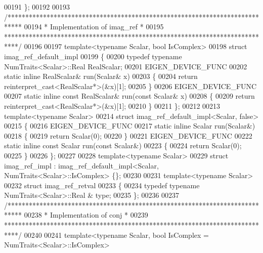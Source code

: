 \begin{DoxyCode}
00191 \};
00192 
00193 \textcolor{comment}{/****************************************************************************}
00194 \textcolor{comment}{* Implementation of imag\_ref                                             *}
00195 \textcolor{comment}{****************************************************************************/}
00196 
00197 \textcolor{keyword}{template}<\textcolor{keyword}{typename} Scalar, \textcolor{keywordtype}{bool} IsComplex>
00198 \textcolor{keyword}{struct }imag\_ref\_default\_impl
00199 \{
00200   \textcolor{keyword}{typedef} \textcolor{keyword}{typename} NumTraits<Scalar>::Real RealScalar;
00201   EIGEN\_DEVICE\_FUNC
00202   \textcolor{keyword}{static} \textcolor{keyword}{inline} RealScalar& run(Scalar& x)
00203   \{
00204     \textcolor{keywordflow}{return} \textcolor{keyword}{reinterpret\_cast<}RealScalar*\textcolor{keyword}{>}(&x)[1];
00205   \}
00206   EIGEN\_DEVICE\_FUNC
00207   \textcolor{keyword}{static} \textcolor{keyword}{inline} \textcolor{keyword}{const} RealScalar& run(\textcolor{keyword}{const} Scalar& x)
00208   \{
00209     \textcolor{keywordflow}{return} \textcolor{keyword}{reinterpret\_cast<}RealScalar*\textcolor{keyword}{>}(&x)[1];
00210   \}
00211 \};
00212 
00213 \textcolor{keyword}{template}<\textcolor{keyword}{typename} Scalar>
00214 \textcolor{keyword}{struct }imag\_ref\_default\_impl<Scalar, false>
00215 \{
00216   EIGEN\_DEVICE\_FUNC
00217   \textcolor{keyword}{static} \textcolor{keyword}{inline} Scalar run(Scalar&)
00218   \{
00219     \textcolor{keywordflow}{return} Scalar(0);
00220   \}
00221   EIGEN\_DEVICE\_FUNC
00222   \textcolor{keyword}{static} \textcolor{keyword}{inline} \textcolor{keyword}{const} Scalar run(\textcolor{keyword}{const} Scalar&)
00223   \{
00224     \textcolor{keywordflow}{return} Scalar(0);
00225   \}
00226 \};
00227 
00228 \textcolor{keyword}{template}<\textcolor{keyword}{typename} Scalar>
00229 \textcolor{keyword}{struct }imag\_ref\_impl : imag\_ref\_default\_impl<Scalar, NumTraits<Scalar>::IsComplex> \{\};
00230 
00231 \textcolor{keyword}{template}<\textcolor{keyword}{typename} Scalar>
00232 \textcolor{keyword}{struct }imag\_ref\_retval
00233 \{
00234   \textcolor{keyword}{typedef} \textcolor{keyword}{typename} NumTraits<Scalar>::Real & type;
00235 \};
00236 
00237 \textcolor{comment}{/****************************************************************************}
00238 \textcolor{comment}{* Implementation of conj                                                 *}
00239 \textcolor{comment}{****************************************************************************/}
00240 
00241 template<typename Scalar, bool IsComplex = NumTraits<Scalar>::IsComplex>

\end{DoxyCode}
